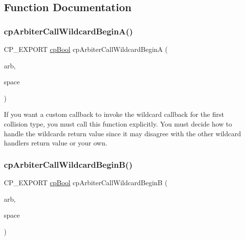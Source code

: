\subsection{Function Documentation}
\mbox{\label{group__cpArbiter_ga820d3549634a11d573eaa97923d59597}} 
\subsubsection{\texorpdfstring{cp\+Arbiter\+Call\+Wildcard\+Begin\+A()}{cpArbiterCallWildcardBeginA()}}
{\footnotesize\ttfamily C\+P\+\_\+\+E\+X\+P\+O\+RT \hyperlink{group__basicTypes_gabc5e752c48f3449ca26ef413ecbd647e}{cp\+Bool} cp\+Arbiter\+Call\+Wildcard\+BeginA (\begin{DoxyParamCaption}\item[{\hyperlink{structcpArbiter}{cp\+Arbiter} $\ast$}]{arb,  }\item[{\hyperlink{structcpSpace}{cp\+Space} $\ast$}]{space }\end{DoxyParamCaption})}

If you want a custom callback to invoke the wildcard callback for the first collision type, you must call this function explicitly. You must decide how to handle the wildcard\textquotesingle{}s return value since it may disagree with the other wildcard handler\textquotesingle{}s return value or your own. \mbox{\label{group__cpArbiter_ga7a0a1ad2040728e877d72ff16868fcef}} 
\subsubsection{\texorpdfstring{cp\+Arbiter\+Call\+Wildcard\+Begin\+B()}{cpArbiterCallWildcardBeginB()}}
{\footnotesize\ttfamily C\+P\+\_\+\+E\+X\+P\+O\+RT \hyperlink{group__basicTypes_gabc5e752c48f3449ca26ef413ecbd647e}{cp\+Bool} cp\+Arbiter\+Call\+Wildcard\+BeginB (\begin{DoxyParamCaption}\item[{\hyperlink{structcpArbiter}{cp\+Arbiter} $\ast$}]{arb,  }\item[{\hyperlink{structcpSpace}{cp\+Space} $\ast$}]{space }\end{DoxyParamCaption})}

